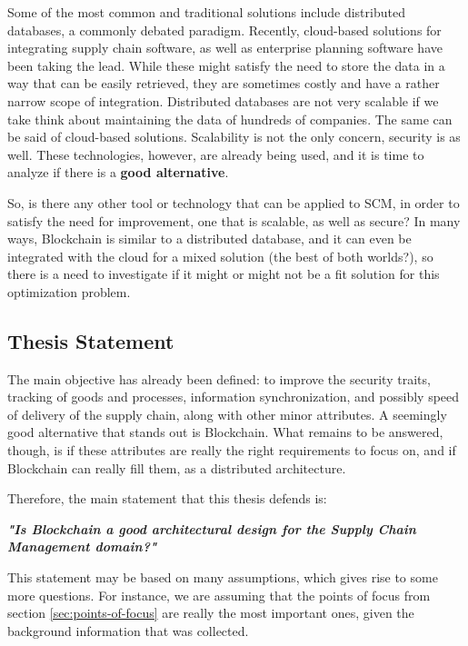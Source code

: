 Some of the most common and traditional solutions include distributed databases, a commonly debated paradigm. Recently, cloud-based solutions for integrating supply chain software, as well as enterprise planning software have been taking the lead. While these might satisfy the need to store the data in a way that can be easily retrieved, they are sometimes costly and have a rather narrow scope of integration. Distributed databases are not very scalable if we take think about maintaining the data of hundreds of companies. The same can be said of cloud-based solutions. Scalability is not the only concern, security is as well. These technologies, however, are already being used, and it is time to analyze if there is a \textbf {good alternative}.%

So, is there any other tool or technology that can be applied to SCM, in order to satisfy the need for improvement, one that is scalable, as well as secure?
In many ways, Blockchain is similar to a distributed database, and it can even be integrated with the cloud for a mixed solution (the best of both worlds?), so there is a need to investigate if it might or might not be a fit solution for this optimization problem.

\subsection{Thesis Statement}
\label{subsec:thesis-statement}
The main objective has already been defined: to improve the security traits, tracking of goods and processes, information synchronization, and possibly speed of delivery of the supply chain, along with other minor attributes. A seemingly good alternative that stands out is Blockchain. What remains to be answered, though, is if these attributes are really the right requirements to focus on, and if Blockchain can really fill them, as a distributed architecture.

Therefore, the main statement that this thesis defends is: 

\par \textbf{\textit{"Is Blockchain a good architectural design for the Supply Chain Management domain?"}}

This statement may be based on many assumptions, which gives rise to some more questions. For instance, we are assuming that the points of focus from section \ref{sec:points-of-focus} are really the most important ones, given the background information that was collected.

